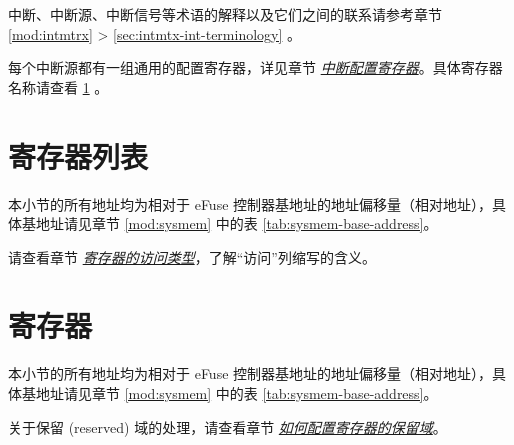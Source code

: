 \documentclass[main\_\_CN.tex]{subfiles}
\begin{document}
\begin{tiplisting}
中断、中断源、中断信号等术语的解释以及它们之间的联系请参考章节 \ref{mod:intmtrx} \textit{} > \ref{sec:intmtx-int-terminology} \textit{}。
\end{tiplisting}

每个中断源都有一组通用的配置寄存器，详见章节 \hyperref[interrupt-config-registers]{\textit{中断配置寄存器}}。具体寄存器名称请查看 \ref{sec:efuse-reg-summ} \textit{}。



\newpage
\section{寄存器列表}
\label{sec:efuse-reg-summ}
\hypertarget{efuse-reg-summ}{}


本小节的所有地址均为相对于 eFuse 控制器基地址的地址偏移量（相对地址），具体基地址请见章节 \ref{mod:sysmem} \textit{} 中的表 \ref{tab:sysmem-base-address}。

请查看章节 \hyperref[glossary-access-types]{\textit{寄存器的访问类型}}，了解“访问”列缩写的含义。





\newpage
\section{寄存器}

本小节的所有地址均为相对于 eFuse 控制器基地址的地址偏移量（相对地址），具体基地址请见章节 \ref{mod:sysmem} \textit{} 中的表 \ref{tab:sysmem-base-address}。

关于保留 (reserved) 域的处理，请查看章节 \hyperref[programming-reserved-field]{\textit{如何配置寄存器的保留域}}。


\end{document}
